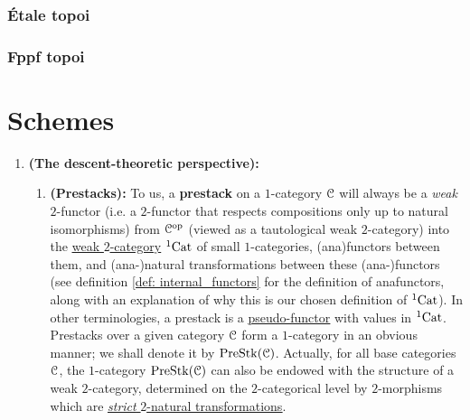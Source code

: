             \subsubsection{\'Etale topoi} 
            
            \subsubsection{Fppf topoi} 
        
    \section{Schemes} \label{section: schemes}
        \begin{convention} \label{conv: prestacks}  
            \noindent
            \begin{enumerate}
                \item \textbf{(The descent-theoretic perspective):} \begin{enumerate}
                    \item \textbf{(Prestacks):} To us, a \textbf{prestack} on a $1$-category $\mathcal{C}$ will always be a \textit{weak} $2$-functor (i.e. a $2$-functor that respects compositions only up to natural isomorphisms) from $\mathcal{C}^{\mathrm{op}}$ (viewed as a tautological weak $2$-category) into the \href{https://ncatlab.org/nlab/show/bicategory}{\underline{weak $2$-category}} ${}^1\mathrm{Cat}$ of small $1$-categories, (ana)functors between them, and (ana-)natural transformations between these (ana-)functors (see definition \ref{def: internal_functors} for the definition of anafunctors, along with an explanation of why this is our chosen definition of ${}^1\mathrm{Cat}$). In other terminologies, a prestack is a \href{https://ncatlab.org/nlab/show/pseudofunctor}{\underline{pseudo-functor}} with values in ${}^1\mathrm{Cat}$. Prestacks over a given category $\mathcal{C}$ form a $1$-category in an obvious manner; we shall denote it by $\mathrm{Pre}\mathrm{Stk}(\mathcal{C})$. Actually, for all base categories $\mathcal{C}$, the $1$-category $\mathrm{Pre}\mathrm{Stk}(\mathcal{C})$ can also be endowed with the structure of a weak $2$-category, determined on the $2$-categorical level by $2$-morphisms which are \href{https://ncatlab.org/nlab/show/strict+2-natural+transformation}{\underline{\textit{strict} $2$-natural transformations}}.
                    

\end{enumerate}
\end{enumerate}
\end{convention}

